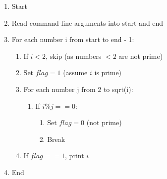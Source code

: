 \begin{enumerate}
    \item Start
    \item Read command-line arguments into start and end
    \item For each number i from start to end - 1:
    \begin{enumerate}
        \item If $i < 2$, skip (as numbers $< 2$ are not prime)
        \item Set $flag = 1$ (assume $i$ is prime)
        \item For each number j from 2 to sqrt(i):
        \begin{enumerate}
            \item If $i \% j == 0:$
            \begin{enumerate}
                \item Set $flag = 0$ (not prime)
                \item Break
            \end{enumerate}
        \end{enumerate}
        \item If $flag == 1$, print $i$
    \end{enumerate}
    \item End
\end{enumerate}